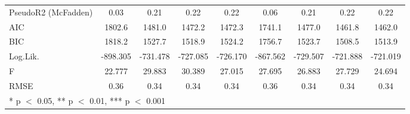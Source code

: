 \begin{table}
\begin{tabular}[t]{lcccccccc}
PseudoR2 (McFadden) & 0.03 & 0.21 & 0.22 & 0.22 & 0.06 & 0.21 & 0.22 & 0.22\\
AIC & 1802.6 & 1481.0 & 1472.2 & 1472.3 & 1741.1 & 1477.0 & 1461.8 & 1462.0\\
BIC & 1818.2 & 1527.7 & 1518.9 & 1524.2 & 1756.7 & 1523.7 & 1508.5 & 1513.9\\
Log.Lik. & -898.305 & -731.478 & -727.085 & -726.170 & -867.562 & -729.507 & -721.888 & -721.019\\
F & 22.777 & 29.883 & 30.389 & 27.015 & 27.695 & 26.883 & 27.729 & 24.694\\
RMSE & 0.36 & 0.34 & 0.34 & 0.34 & 0.36 & 0.34 & 0.34 & 0.34\\
\bottomrule
\multicolumn{9}{l}{\rule{0pt}{1em}* p $<$ 0.05, ** p $<$ 0.01, *** p $<$ 0.001}\\
\end{tabular}
\end{table}
